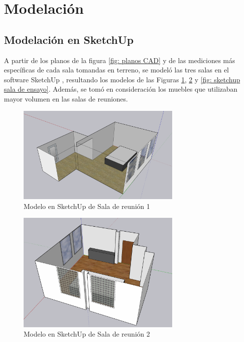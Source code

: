 \section{Modelación}
\subsection{Modelación en SketchUp}
A partir de los planos de la figura \ref{fig: planos CAD} y de las mediciones más específicas de cada sala tomandas en terreno, se modeló las tres salas en el software SketchUp \cite{sketchup}, resultando los modelos de las Figuras \ref{fig: sketchup sala 1}, \ref{fig: sketchup sala 2} y \ref{fig: sketchup sala de ensayo}. Además, se tomó en consideración los muebles que utilizaban mayor volumen en las salas de reuniones. 
\begin{figure}[H]
    \centering
    \includegraphics[width=8cm]{Imagenes/Modelacion/Sala 1 Sketchup.png}
    \caption{Modelo en SketchUp de Sala de reunión 1}
    \label{fig: sketchup sala 1}
\end{figure}

\begin{figure}[H]
    \centering
    \includegraphics[width=8cm]{Imagenes/Modelacion/Sala 2 Sketchup.png}
    \caption{Modelo en SketchUp de Sala de reunión 2}
    \label{fig: sketchup sala 2}
\end{figure}

